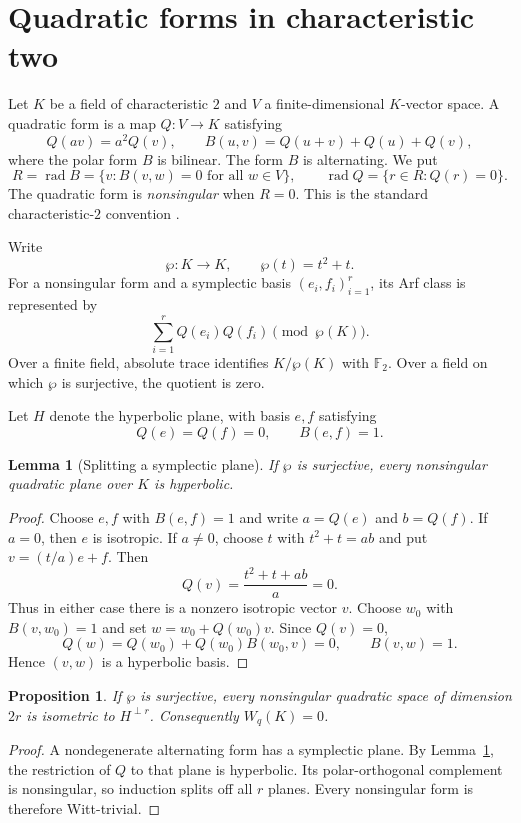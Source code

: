 \documentclass[11pt]{article}
\newtheorem{proposition}[theorem]{Proposition}
\newtheorem{lemma}[theorem]{Lemma}
\theoremstyle{definition}
\theoremstyle{remark}
\newcommand{\F}{\mathbb{F}}
\newcommand{\rad}{\operatorname{rad}}
\newcommand{\wpmap}{\wp}
\begin{document}
\section{Quadratic forms in characteristic two}

Let $K$ be a field of characteristic $2$ and $V$ a finite-dimensional
$K$-vector space.  A quadratic form is a map $Q:V\to K$ satisfying
\[
  Q(av)=a^2Q(v),\qquad
  B(u,v)=Q(u+v)+Q(u)+Q(v),
\]
where the polar form $B$ is bilinear.  The form $B$ is alternating.  We put
\[
  R=\rad B=\{v:B(v,w)=0\text{ for all }w\in V\},
  \qquad
  \rad Q=\{r\in R:Q(r)=0\}.
\]
The quadratic form is \emph{nonsingular} when $R=0$.  This is the standard
characteristic-$2$ convention \cite[Chapter II, Section 7]
{elmankarpenkomerkurjev2008}.

Write
\[
  \wpmap:K\longrightarrow K,\qquad \wpmap(t)=t^2+t.
\]
For a nonsingular form and a symplectic basis $(e_i,f_i)_{i=1}^r$, its Arf
class is represented by
\[
  \sum_{i=1}^r Q(e_i)Q(f_i)\pmod{\wpmap(K)}.
\]
Over a finite field, absolute trace identifies $K/\wpmap(K)$ with $\F_2$.
Over a field on which $\wpmap$ is surjective, the quotient is zero.

Let $H$ denote the hyperbolic plane, with basis $e,f$ satisfying
\[
  Q(e)=Q(f)=0,\qquad B(e,f)=1.
\]

\begin{lemma}[Splitting a symplectic plane]\label{lem:plane}
If $\wpmap$ is surjective, every nonsingular quadratic plane over $K$ is
hyperbolic.
\end{lemma}

\begin{proof}
Choose $e,f$ with $B(e,f)=1$ and write $a=Q(e)$ and $b=Q(f)$.  If $a=0$,
then $e$ is isotropic.  If $a\ne0$, choose $t$ with $t^2+t=ab$ and put
$v=(t/a)e+f$.  Then
\[
  Q(v)=\frac{t^2+t+ab}{a}=0.
\]
Thus in either case there is a nonzero isotropic vector $v$.  Choose $w_0$
with $B(v,w_0)=1$ and set $w=w_0+Q(w_0)v$.  Since $Q(v)=0$,
\[
  Q(w)=Q(w_0)+Q(w_0)B(w_0,v)=0,
  \qquad B(v,w)=1.
\]
Hence $(v,w)$ is a hyperbolic basis.
\end{proof}

\begin{proposition}\label{prop:nonsingular}
If $\wpmap$ is surjective, every nonsingular quadratic space of dimension
$2r$ is isometric to $H^{\perp r}$.  Consequently $W_q(K)=0$.
\end{proposition}

\begin{proof}
A nondegenerate alternating form has a symplectic plane.  By
Lemma~\ref{lem:plane}, the restriction of $Q$ to that plane is hyperbolic.
Its polar-orthogonal complement is nonsingular, so induction splits off all
$r$ planes.  Every nonsingular form is therefore Witt-trivial.
\end{proof}
\end{document}
